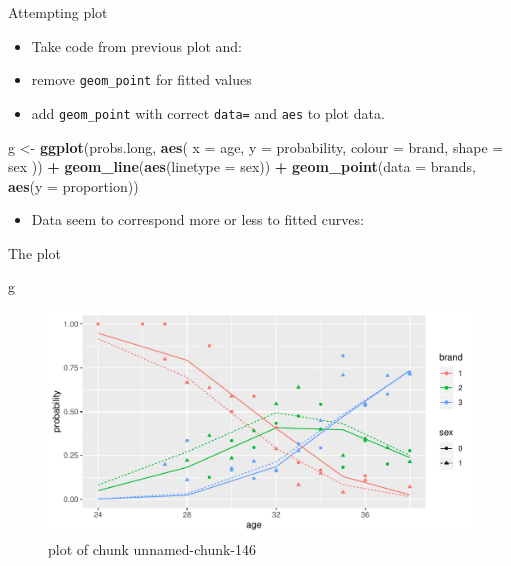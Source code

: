 \documentclass[ignorenonframetext,]{beamer}
\newenvironment{Shaded}{\begin{snugshade}}{\end{snugshade}}
\newcommand{\DataTypeTok}[1]{\textcolor[rgb]{0.13,0.29,0.53}{#1}}
\newcommand{\KeywordTok}[1]{\textcolor[rgb]{0.13,0.29,0.53}{\textbf{#1}}}
\newcommand{\NormalTok}[1]{#1}
\newcommand{\OperatorTok}[1]{\textcolor[rgb]{0.81,0.36,0.00}{\textbf{#1}}}
\newcommand{\StringTok}[1]{\textcolor[rgb]{0.31,0.60,0.02}{#1}}
\providecommand{\tightlist}{%
  \setlength{\itemsep}{0pt}\setlength{\parskip}{0pt}}
\begin{document}
\begin{frame}[fragile]{Attempting plot}
\protect\hypertarget{attempting-plot}{}

\begin{itemize}
\item
  Take code from previous plot and:
\item
  remove \texttt{geom\_point} for fitted values
\item
  add \texttt{geom\_point} with correct \texttt{data=} and \texttt{aes}
  to plot data.
\end{itemize}

\begin{Shaded}
\begin{Highlighting}[]
\NormalTok{g <-}\StringTok{ }\KeywordTok{ggplot}\NormalTok{(probs.long, }\KeywordTok{aes}\NormalTok{(}
  \DataTypeTok{x =}\NormalTok{ age, }\DataTypeTok{y =}\NormalTok{ probability,}
  \DataTypeTok{colour =}\NormalTok{ brand, }\DataTypeTok{shape =}\NormalTok{ sex}
\NormalTok{)) }\OperatorTok{+}
\StringTok{  }\KeywordTok{geom_line}\NormalTok{(}\KeywordTok{aes}\NormalTok{(}\DataTypeTok{linetype =}\NormalTok{ sex)) }\OperatorTok{+}
\StringTok{  }\KeywordTok{geom_point}\NormalTok{(}\DataTypeTok{data =}\NormalTok{ brands, }\KeywordTok{aes}\NormalTok{(}\DataTypeTok{y =}\NormalTok{ proportion))}
\end{Highlighting}
\end{Shaded}

\begin{itemize}
\tightlist
\item
  Data seem to correspond more or less to fitted curves:
\end{itemize}

\end{frame}

\begin{frame}[fragile]{The plot}
\protect\hypertarget{the-plot-2}{}

\begin{Shaded}
\begin{Highlighting}[]
\NormalTok{g}
\end{Highlighting}
\end{Shaded}

\begin{figure}
\centering
\includegraphics{figure/unnamed-chunk-146-1.pdf}
\caption{plot of chunk unnamed-chunk-146}
\end{figure}

\end{frame}
\end{document}
